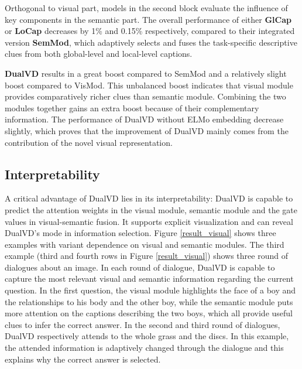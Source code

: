 \documentclass[letterpaper]{article} \usepackage{aaai20}  \usepackage{times}  \usepackage{helvet} \usepackage{courier}  \usepackage[hyphens]{url}  \usepackage{graphicx} \urlstyle{rm} \def\UrlFont{\rm}  \usepackage{graphicx}  \frenchspacing  \setlength{\pdfpagewidth}{8.5in}  \setlength{\pdfpageheight}{11in}  \usepackage{mathrsfs} \usepackage{amsfonts,amssymb}  \usepackage{tabularx} \usepackage{url}
\begin{document}
Orthogonal to visual part, models in the second block evaluate the influence of key components in the semantic part. The overall performance of either \textbf{GlCap} or \textbf{LoCap} decreases by 1\% and 0.15\% respectively, compared to their integrated version \textbf{SemMod}, which adaptively selects and fuses the task-specific descriptive clues from both global-level and local-level captions. 

\textbf{DualVD} results in a great boost compared to SemMod and a relatively slight boost compared to VisMod. This unbalanced boost indicates that visual module provides comparatively richer clues than semantic module. Combining the two modules together gains an extra boost because of their complementary information. The performance of DualVD without ELMo embedding decrease slightly, which proves that the improvement of DualVD mainly comes from the contribution of the novel visual representation.



\subsection{Interpretability}

A critical advantage of DualVD lies in its interpretability: DualVD is capable to predict the attention weights in the visual module, semantic module and the gate values in visual-semantic fusion. It supports explicit visualization and can reveal DualVD's mode in information selection. Figure \ref{result_visual} shows three examples with variant dependence on visual and semantic modules. The third example (third and fourth rows in Figure \ref{result_visual}) shows three round of dialogues about an image. In each round of dialogue, DualVD is capable to capture the most relevant visual and semantic information regarding the current question. In the first question, the visual module highlights the face of a boy and the relationships to his body and the other boy, while the semantic module puts more attention on the captions describing the two boys, which all provide useful clues to infer the correct answer. In the second and third round of dialogues, DualVD respectively attends to the whole grass and the discs. In this example, the attended information is adaptively changed through the dialogue and this explains why the correct answer is selected.
\end{document}
